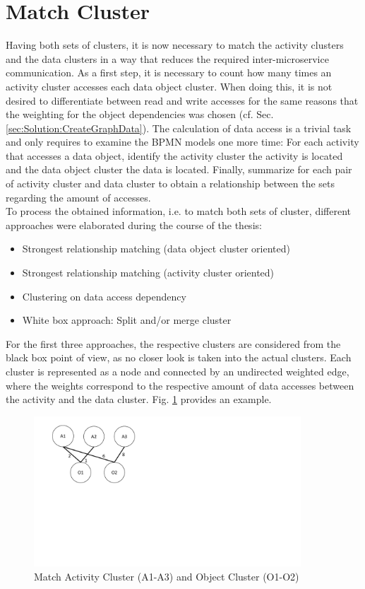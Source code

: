 \section{Match Cluster}
\label{sec:Solution:MatchCluster}
Having both sets of clusters, it is now necessary to match the activity clusters and the data clusters in a way that reduces the required inter-microservice communication. As a first step, it is necessary to count how many times an activity cluster accesses each data object cluster. When doing this, it is not desired to differentiate between read and write accesses for the same reasons that the weighting for the object dependencies was chosen (cf. Sec. \ref{sec:Solution:CreateGraphData}). The calculation of data access is a trivial task and only requires to examine the BPMN models one more time: For each activity that accesses a data object, identify the activity cluster the activity is located and the data object cluster the data is located. Finally, summarize for each pair of activity cluster and data cluster to obtain a relationship between the sets regarding the amount of accesses.\\
To process the obtained information, i.e. to match both sets of cluster, different approaches were elaborated during the course of the thesis:

\begin{itemize}
	\item Strongest relationship matching (data object cluster oriented)
	\item Strongest relationship matching (activity cluster oriented)
	\item Clustering on data access dependency
	\item White box approach: Split and/or merge cluster
\end{itemize}

For the first three approaches, the respective clusters are considered from the black box point of view, as no closer look is taken into the actual clusters. Each cluster is represented as a node and connected by an undirected weighted edge, where the weights correspond to the respective amount of data accesses between the activity and the data cluster. Fig. \ref{fig:matchCluster} provides an example.\\

\begin{figure}[h!]
	\centering
	\includegraphics[width=10cm, trim={1.5cm 9.5cm 16.0cm 0cm}]{img/MatchCluster.pdf}
	\caption{Match Activity Cluster (A1-A3) and Object Cluster (O1-O2)}
	\label{fig:matchCluster}
\end{figure}


